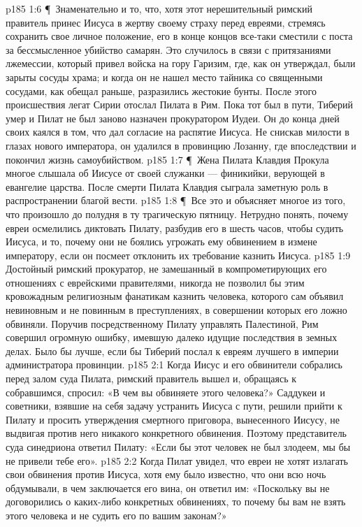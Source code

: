 \vs p185 1:6 \P\ Знаменательно и то, что, хотя этот нерешительный римский правитель принес Иисуса в жертву своему страху перед евреями, стремясь сохранить свое личное положение, его в конце концов все\hyp{}таки сместили с поста за бессмысленное убийство самарян. Это случилось в связи с притязаниями лжемессии, который привел войска на гору Гаризим, где, как он утверждал, были зарыты сосуды храма; и когда он не нашел место тайника со священными сосудами, как обещал раньше, разразились жестокие бунты. После этого происшествия легат Сирии отослал Пилата в Рим. Пока тот был в пути, Тиберий умер и Пилат не был заново назначен прокуратором Иудеи. Он до конца дней своих каялся в том, что дал согласие на распятие Иисуса. Не снискав милости в глазах нового императора, он удалился в провинцию Лозанну, где впоследствии и покончил жизнь самоубийством.
\vs p185 1:7 \P\ Жена Пилата Клавдия Прокула многое слышала об Иисусе от своей служанки --- финикийки, верующей в евангелие царства. После смерти Пилата Клавдия сыграла заметную роль в распространении благой вести.
\vs p185 1:8 \P\ Все это и объясняет многое из того, что произошло до полудня в ту трагическую пятницу. Нетрудно понять, почему евреи осмелились диктовать Пилату, разбудив его в шесть часов, чтобы судить Иисуса, и то, почему они не боялись угрожать ему обвинением в измене императору, если он посмеет отклонить их требование казнить Иисуса.
\vs p185 1:9 Достойный римский прокуратор, не замешанный в компрометирующих его отношениях с еврейскими правителями, никогда не позволил бы этим кровожадным религиозным фанатикам казнить человека, которого сам объявил невиновным и не повинным в преступлениях, в совершении которых его ложно обвиняли. Поручив посредственному Пилату управлять Палестиной, Рим совершил огромную ошибку, имевшую далеко идущие последствия в земных делах. Было бы лучше, если бы Тиберий послал к евреям лучшего в империи администратора провинции.
\vs p185 2:1 Когда Иисус и его обвинители собрались перед залом суда Пилата, римский правитель вышел и, обращаясь к собравшимся, спросил: «В чем вы обвиняете этого человека?» Саддукеи и советники, взявшие на себя задачу устранить Иисуса с пути, решили прийти к Пилату и просить утверждения смертного приговора, вынесенного Иисусу, не выдвигая против него никакого конкретного обвинения. Поэтому представитель суда синедриона ответил Пилату: «Если бы этот человек не был злодеем, мы бы не привели тебе его».
\vs p185 2:2 Когда Пилат увидел, что евреи не хотят излагать свои обвинения против Иисуса, хотя ему было известно, что они всю ночь обдумывали, в чем заключается его вина, он ответил им: «Поскольку вы не договорились о каких\hyp{}либо конкретных обвинениях, то почему бы вам не взять этого человека и не судить его по вашим законам?»
